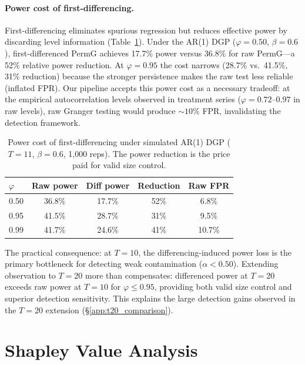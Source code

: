 \paragraph{Power cost of first-differencing.}
First-differencing eliminates spurious regression but reduces effective power by discarding level information (Table~\ref{tab:diff_power_cost}).
Under the AR(1) DGP ($\varphi{=}0.50$, $\beta{=}0.6$), first-differenced PermG achieves 17.7\% power versus 36.8\% for raw PermG---a 52\% relative power reduction.
At $\varphi{=}0.95$ the cost narrows (28.7\% vs.\ 41.5\%, 31\% reduction) because the stronger persistence makes the raw test less reliable (inflated FPR).
Our pipeline accepts this power cost as a necessary tradeoff: at the empirical autocorrelation levels observed in treatment series ($\varphi{=}0.72$--$0.97$ in raw levels), raw Granger testing would produce ${\sim}10\%$ FPR, invalidating the detection framework.

\begin{table}[t]
\centering
\small
\caption{Power cost of first-differencing under simulated AR(1) DGP ($T{=}11$, $\beta{=}0.6$, 1{,}000 reps). The power reduction is the price paid for valid size control.}
\label{tab:diff_power_cost}
\begin{tabular}{lcccc}
\toprule
$\varphi$ & Raw power & Diff power & Reduction & Raw FPR \\
\midrule
0.50 & 36.8\% & 17.7\% & 52\% & 6.8\% \\
0.95 & 41.5\% & 28.7\% & 31\% & 9.5\% \\
0.99 & 41.7\% & 24.6\% & 41\% & 10.7\% \\
\bottomrule
\end{tabular}
\end{table}

The practical consequence: at $T{=}10$, the differencing-induced power loss is the primary bottleneck for detecting weak contamination ($\alpha < 0.50$).
Extending observation to $T{=}20$ more than compensates: differenced power at $T{=}20$ exceeds raw power at $T{=}10$ for $\varphi \leq 0.95$, providing both valid size control and superior detection sensitivity.
This explains the large detection gains observed in the $T{=}20$ extension (\S\ref{app:t20_comparison}).

\section{Shapley Value Analysis}
\label{app:shapley}

